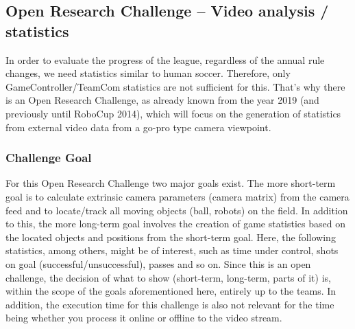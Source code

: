 \subsection{Open Research Challenge -- Video analysis / statistics}
In order to evaluate the progress of the league, regardless of the annual rule changes, we need statistics similar to human soccer. Therefore, only GameController/TeamCom statistics are not sufficient for this. That's why there is an Open Research Challenge, as already known from the year 2019 (and previously until RoboCup 2014), which will focus on the generation of statistics from external video data from a go-pro type camera viewpoint.

    \subsubsection{Challenge Goal}
    For this Open Research Challenge two major goals exist. The more short-term goal is to calculate extrinsic camera parameters (camera matrix) from the camera feed and to locate/track all moving objects (ball, robots) on the field. In addition to this, the more long-term goal involves the creation of game statistics based on the located objects and positions from the short-term goal. Here, the following statistics, among others, might be of interest, such as time under control, shots on goal (successful/unsuccessful), passes and so on. Since this is an open challenge, the decision of what to show (short-term, long-term, parts of it) is, within the scope of the goals aforementioned here, entirely up to the teams. In addition, the execution time for this challenge is also not relevant for the time being whether you process it online or offline to the video stream.

